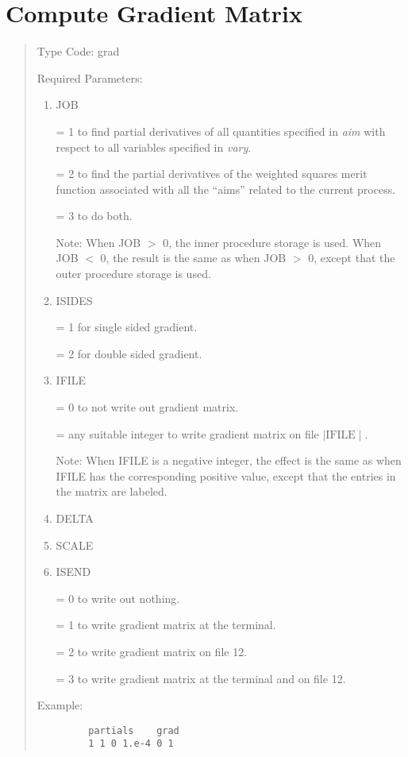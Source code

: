\section{Compute Gradient Matrix} 
\begin{quotation}
\noindent     Type Code:  grad
\vspace{5mm}

\noindent Required Parameters:
\begin{enumerate}
       \item  JOB

              = 1 to find partial derivatives of all quantities specified
in {\em aim} with respect \hspace*{1em}to all variables specified in {\em vary}.

			  = 2 to find the partial derivatives of the weighted squares merit
function \hspace*{1em}associated with all the ``aims'' related to the current
process.

               = 3 to do both.

               Note:  When JOB $>$ 0, the inner procedure storage is
used.  When JOB $<$ 0, the result is the same as when JOB $>$ 0, except
that the outer procedure storage is used.

       \item  ISIDES

              = 1 for single sided gradient.

              = 2 for double sided gradient.

       \item  IFILE

              = 0 to not write out gradient matrix.

              = any suitable integer to write gradient matrix on file $\mid \mbox{IFILE} \mid$.

              Note:  When IFILE is a negative integer, the effect is the same as when IFILE has the corresponding positive value, except that the entries in the matrix are labeled.

      \item   DELTA

       \item  SCALE

       \item  ISEND

              = 0 to write out nothing.

              = 1 to write gradient matrix at the terminal.

              = 2 to write gradient matrix on file 12.

              = 3 to write gradient matrix at the terminal and on file 12.
\end{enumerate}

\vspace{5mm}
\noindent Example:
\begin{verbatim}
         partials    grad
         1 1 0 1.e-4 0 1
\end{verbatim}
\end{quotation}
